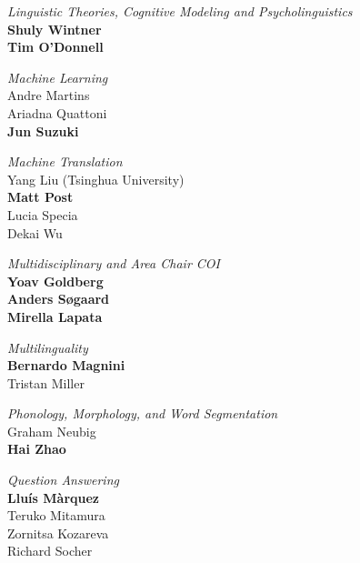 \emph{Linguistic Theories, Cognitive Modeling and Psycholinguistics}\\
\hspace*{5mm}\textbf{Shuly Wintner} \\
\hspace*{5mm}\textbf{Tim O'Donnell}

\emph{Machine Learning} \\
\hspace*{5mm}Andre Martins \\
\hspace*{5mm}Ariadna Quattoni \\
\hspace*{5mm}\textbf{Jun Suzuki}

\emph{Machine Translation} \\
\hspace*{5mm}Yang Liu (Tsinghua University)\\
\hspace*{5mm}\textbf{Matt Post} \\
\hspace*{5mm}Lucia Specia \\
\hspace*{5mm}Dekai Wu

\emph{Multidisciplinary and Area Chair COI}\\
\hspace*{5mm}\textbf{Yoav Goldberg} \\
\hspace*{5mm}\textbf{Anders Søgaard} \\
\hspace*{5mm}\textbf{Mirella Lapata}

\emph{Multilinguality}\\
\hspace*{5mm}\textbf{Bernardo Magnini} \\
\hspace*{5mm}Tristan Miller

\emph{Phonology, Morphology, and Word Segmentation} \\
\hspace*{5mm}Graham Neubig \\
\hspace*{5mm}\textbf{Hai Zhao}

\emph{Question Answering}\\
\hspace*{5mm}\textbf{Lluís Màrquez} \\
\hspace*{5mm}Teruko Mitamura \\
\hspace*{5mm}Zornitsa Kozareva \\
\hspace*{5mm}Richard Socher

